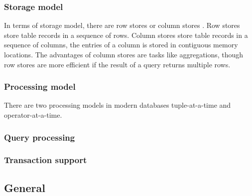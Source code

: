 \subsubsection{Storage model}
In terms of storage model, there are row stores or column stores \cite{abadi2008column}.
Row stores store table records in a sequence of rows.
Column stores store table records in a sequence of columns, the entries of a column is stored in contiguous memory locations.
The advantages of column stores are tasks like aggregations, though row stores are more efficient if the result of a query returns multiple rows.


\subsubsection{Processing model}
There are two processing models in modern databases tuple-at-a-time and operator-at-a-time.

\subsubsection{Query processing}

\subsubsection{Transaction support}

\newpage

\subsection{General}